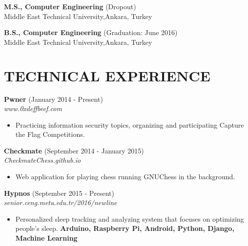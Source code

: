 \documentclass[margin, 10pt]{res} %
\begin{document}
\begin{resume}
        {\bf M.S., Computer Engineering } \hfill {(Dropout)}\\
        Middle East Technical University,Ankara, Turkey

        {\bf B.S., Computer Engineering } \hfill {(Graduation: June 2016)}\\
        Middle East Technical University,Ankara, Turkey


        \section{TECHNICAL EXPERIENCE}

        {\bf Pwner} \hfill (January 2014 - Present) \\
        \textit{www.0xdeffbeef.com}
        \begin{itemize}
            \item Practicing information security topics, organizing and participating Capture the Flag Competitions.
        \end{itemize}

        {\bf Checkmate} \hfill (September 2014 - January 2015) \\
        \textit{CheckmateChess.github.io}
        \begin{itemize}
            \item Web application for playing chess running GNUChess in the background.
        \end{itemize}

       

        {\bf Hypnos} \hfill (September 2015 - Present) \\
        \textit{senior.ceng.metu.edu.tr/2016/newline}
        \begin{itemize}
            \item Personalized sleep tracking and analyzing system that focuses on optimizing people's sleep. {\bf Arduino, Raspberry Pi, Android, Python, Django, Machine Learning }
        \end{itemize}



\end{resume}
\end{document}
